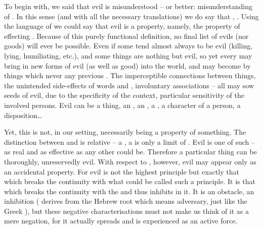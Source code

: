 {To begin with, we said that evil is misunderstood  -- or better:
misunderstanding of . In this sense (and with all the necessary
translations) we do say that , .
Using the language of  we could say that evil is a property,
namely, the property of effecting . Because of this purely
functional definition, no final list of evils (nor goods) will ever be possible.
Even if some  tend almost always to be evil (killing, lying,
humiliating, etc.), and some things are nothing but evil, so yet every
 may bring in new forms of evil (as well as good) into the world,
and may become  by things which never  any previous
.  The imperceptible connections between things, the unintended
side-effects of words and , involuntary associations -- all may sow
 seeds of evil, due to the specificity of the context, particular
sensitivity of the involved persons.  Evil can be a thing, an , an
, a , a character of a person, a disposition\ldots


Yet, this  is not, in our setting, necessarily being a
property of something.  The distinction between  and
 is relative -- a , a  is only a limit
of . Evil is one of such  -- as real and as
effective as any other could be. Therefore a particular thing can be thoroughly,
unreservedly evil.  With respect to , however, evil may appear
only as an accidental  property.  For evil is not the highest principle but
exactly that which breaks
the continuity with
what could be called such a principle.  It is that which breaks the continuity
with the  and thus inhibits  in it. It is an
obstacle, an inhibition ( derives from the Hebrew root  which
means adversary, just like the Greek ), but these
negative characterisations must not make us think of it as a mere negation, for
it actually spreads and is experienced as an active force.

}
